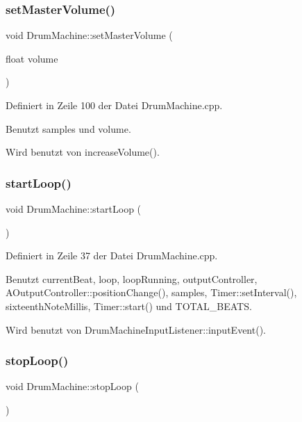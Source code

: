 \subsubsection{\texorpdfstring{set\+Master\+Volume()}{setMasterVolume()}}
{\footnotesize\ttfamily void Drum\+Machine\+::set\+Master\+Volume (\begin{DoxyParamCaption}\item[{float}]{volume }\end{DoxyParamCaption})}



Definiert in Zeile 100 der Datei Drum\+Machine.\+cpp.



Benutzt samples und volume.



Wird benutzt von increase\+Volume().

\mbox{\label{class_drum_machine_ac42508031bbf331d41c8004ed663c1c1}} 
\subsubsection{\texorpdfstring{start\+Loop()}{startLoop()}}
{\footnotesize\ttfamily void Drum\+Machine\+::start\+Loop (\begin{DoxyParamCaption}{ }\end{DoxyParamCaption})}



Definiert in Zeile 37 der Datei Drum\+Machine.\+cpp.



Benutzt current\+Beat, loop, loop\+Running, output\+Controller, A\+Output\+Controller\+::position\+Change(), samples, Timer\+::set\+Interval(), sixteenth\+Note\+Millis, Timer\+::start() und T\+O\+T\+A\+L\+\_\+\+B\+E\+A\+TS.



Wird benutzt von Drum\+Machine\+Input\+Listener\+::input\+Event().

\mbox{\label{class_drum_machine_af1564a42f1c2717534a61437617070b3}} 
\subsubsection{\texorpdfstring{stop\+Loop()}{stopLoop()}}
{\footnotesize\ttfamily void Drum\+Machine\+::stop\+Loop (\begin{DoxyParamCaption}{ }\end{DoxyParamCaption})}



